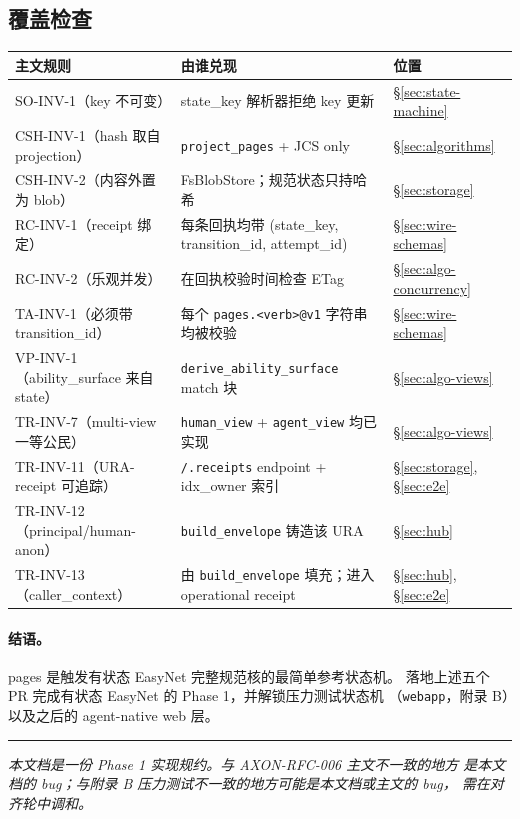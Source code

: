 \documentclass[11pt,a4paper]{article}
\theoremstyle{definition}
\begin{document}
\subsection{覆盖检查}

\begin{center}
\renewcommand{\arraystretch}{1.2}
\begin{tabularx}{\linewidth}{l X l}
\toprule
\textbf{主文规则} & \textbf{由谁兑现} & \textbf{位置} \\
\midrule
SO-INV-1（key 不可变）                   & state\_key 解析器拒绝 key 更新                          & \S\ref{sec:state-machine} \\
CSH-INV-1（hash 取自 projection）       & \texttt{project\_pages} + JCS only                        & \S\ref{sec:algorithms} \\
CSH-INV-2（内容外置为 blob）             & FsBlobStore；规范状态只持哈希                            & \S\ref{sec:storage} \\
RC-INV-1（receipt 绑定）                 & 每条回执均带 (state\_key, transition\_id, attempt\_id)   & \S\ref{sec:wire-schemas} \\
RC-INV-2（乐观并发）                    & 在回执校验时间检查 ETag                                  & \S\ref{sec:algo-concurrency} \\
TA-INV-1（必须带 transition\_id）        & 每个 \texttt{pages.<verb>@v1} 字符串均被校验             & \S\ref{sec:wire-schemas} \\
VP-INV-1（ability\_surface 来自 state）  & \texttt{derive\_ability\_surface} match 块               & \S\ref{sec:algo-views} \\
TR-INV-7（multi-view 一等公民）          & \texttt{human\_view} + \texttt{agent\_view} 均已实现     & \S\ref{sec:algo-views} \\
TR-INV-11（URA-receipt 可追踪）          & \texttt{/.receipts} endpoint + idx\_owner 索引           & \S\ref{sec:storage}, \S\ref{sec:e2e} \\
TR-INV-12（principal/human-anon）        & \texttt{build\_envelope} 铸造该 URA                      & \S\ref{sec:hub} \\
TR-INV-13（caller\_context）             & 由 \texttt{build\_envelope} 填充；进入 operational receipt & \S\ref{sec:hub}, \S\ref{sec:e2e} \\
\bottomrule
\end{tabularx}
\end{center}

\paragraph{结语。} pages 是触发有状态 EasyNet 完整规范核的最简单参考状态机。
落地上述五个 PR 完成有状态 EasyNet 的 Phase 1，并解锁压力测试状态机
（\texttt{webapp}，附录 B）以及之后的 agent-native web 层。

\vfill
\hrule
\vspace{0.4em}
\noindent\small
\textit{本文档是一份 Phase 1 实现规约。与 AXON-RFC-006 主文不一致的地方
是本文档的 bug；与附录 B 压力测试不一致的地方可能是本文档或主文的 bug，
需在对齐轮中调和。}
\end{document}
